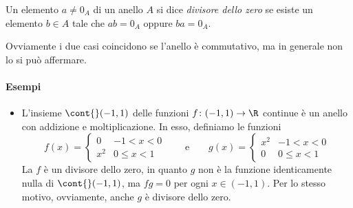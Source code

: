 \begin{definizione} \label{d:divisore-zero}
Un elemento $a\neq 0_A$ di un anello $A$ si dice \emph{divisore dello zero} se esiste un elemento $b\in A$ tale che $ab=0_A$ oppure $ba=0_A$.
\end{definizione}
Ovviamente i due casi coincidono se l'anello è commutativo, ma in generale non lo si può affermare.
\paragraph{Esempi}
\begin{itemize}
	\item L'insieme $\cont{}(-1,1)$ delle funzioni $f\colon(-1,1)\to\R$ continue è un anello con addizione e moltiplicazione.
			In esso, definiamo le funzioni
			\begin{equation*}
				f(x)=
				\begin{cases}
					0& -1<x<0\\
					x^2&0\le x<1
				\end{cases}\qquad\text{e}\qquad
				g(x)=
				\begin{cases}
					x^2& -1<x<0\\
					0&0\le x<1
				\end{cases}
			\end{equation*}
			La $f$ è un divisore dello zero, in quanto $g$ non è la funzione identicamente nulla di $\cont{}(-1,1)$, ma $fg=0$ per ogni $x\in(-1,1)$.
			Per lo stesso motivo, ovviamente, anche $g$ è divisore dello zero.
\begin{comment}
		\item Nell'anello $\mat_{2,2}(\R)$, la matrice $\begin{psmallmatrix}1&0\\0&0\end{psmallmatrix}$ è un divisore dello zero perché
		\begin{equation*}
			\begin{pmatrix}1&0\\0&0\end{pmatrix}\begin{pmatrix}0&0\\1&0\end{pmatrix}=\begin{pmatrix}0&0\\0&0\end{pmatrix}.
		\end{equation*}
	Tale proprietà può essere estesa alle matrici $2\times 2$ in un campo $K$ generico, utilizzando l'unità e lo zero $1_K$ e $0_K$.
		\item In $\Z_{10}$, si prendano le classi $[2]_{10}$ e $[5]_{10}$. Entrambe non sono nulle, perché 2 e 5 non sono divisibili per 10 (non valgono le relazioni $2\equiv 0\mod 10$ e $5\equiv 0\mod 10$). Moltiplicandole, però, risulta $[2]_{10}[5]_{10}=[10]_{10}=[0]_{10}$, perché ovviamente 10 è divisibile per se stesso, quindi $[2]_{10}$ è un divisore dello zero in $\Z_{10}$. Per la commutatività dell'anello, anche $[5]_{10}$ lo è.
	Più in generale, in un anello $\Z_n$ sono divisori dello zero le classi $[a]_n$ dove $a$ è un divisore non banale di $n$.
\end{comment}
\end{itemize}


